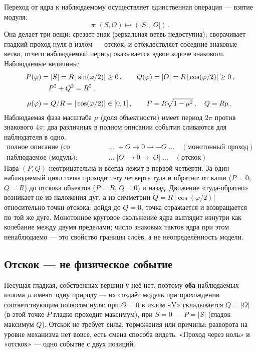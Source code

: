\documentclass{article}
\begin{document}
Переход от ядра к наблюдаемому осуществляет единственная операция --- взятие модуля:
\begin{equation}
\pi : (S, O) \mapsto (|S|, |O|)\,.
\end{equation}
Она делает три вещи: срезает знак (зеркальная ветвь недоступна); сворачивает гладкий проход нуля в излом --- отскок; и отождествляет соседние знаковые ветви, отчего наблюдаемый период оказывается вдвое короче знакового. Наблюдаемые величины:
\begin{align}
P(\varphi) &= |S| = R\,|\sin(\varphi/2)| \ge 0\,, \qquad Q(\varphi) = |O| = R\,|\cos(\varphi/2)| \ge 0\,, \\
&\quad P^2 + Q^2 = R^2\,, \notag \\[4pt]
\mu(\varphi) &= Q/R = |\cos(\varphi/2)| \in [0, 1]\,, \qquad P = R\sqrt{1 - \mu^2}\,, \quad Q = R\mu\,.
\end{align}
Наблюдаемая фаза масштаба $\mu$ (доля объектности) имеет период $2\pi$ против знакового $4\pi$: два различных в полном описании события сливаются для наблюдателя в одно.
\begin{align*}
\text{полное описание (со знаком):} &\quad \ldots\; +O \to 0 \to -O \;\ldots \quad (\text{монотонный проход}) \\
\text{наблюдаемое (модуль):} &\quad \ldots\; |O| \to 0 \to |O| \;\ldots \quad (\text{отскок})
\end{align*}
Пара $(P, Q)$ неотрицательна и всегда лежит в первой четверти. За один наблюдаемый цикл точка проходит эту четверть туда и обратно: от каши ($P = 0$, $Q = R$) до отскока объектов ($P = R$, $Q = 0$) и назад. Движение «туда-обратно» возникает не из наложения дуг, а из симметрии $Q = R\,|\cos(\varphi/2)|$ относительно точки отскока: дойдя до $Q = 0$, точка отражается и возвращается по той же дуге. Монотонное круговое скольжение ядра выглядит изнутри как колебание между двумя пределами; число знаковых тактов ядра при этом ненаблюдаемо --- это свойство границы слоёв, а не неопределённость модели.

\subsection{Отскок --- не физическое событие}

Несущая гладкая, собственных вершин у неё нет, поэтому \textbf{оба} наблюдаемых излома $\mu$ имеют одну природу --- их создаёт модуль при прохождении соответствующим полюсом нуля: при $O = 0$ в излом «V» складывается $Q = |O|$ (в этой точке $P$ гладко проходит максимум), при $S = 0$ --- $P = |S|$ (гладок максимум $Q$). Отскок не требует силы, торможения или причины: разворота на уровне механизма нет вовсе, есть смена способа видеть. «Проход через ноль» и «отскок» --- одно событие с двух позиций.
\end{document}
